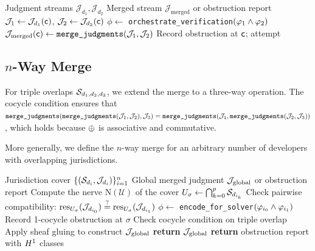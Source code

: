 \documentclass[11pt]{article}
\newcommand{\MergeOp}{\texttt{merge\_judgments}}
\newcommand{\nerve}{\mathrm{N}}
\begin{document}
\begin{algorithm}[t]
\caption{Conflict Resolution via \texttt{orchestrate\_verification}}
\label{alg:conflict}
\begin{algorithmic}[1]
\REQUIRE Judgment streams $\mathcal{J}_{d_1}, \mathcal{J}_{d_2}$
\ENSURE Merged stream $\mathcal{J}_{\text{merged}}$ or obstruction report
  \STATE $\mathcal{J}_1 \gets \mathcal{J}_{d_1}(\mathsf{c})$,
         $\mathcal{J}_2 \gets \mathcal{J}_{d_2}(\mathsf{c})$
  \STATE $\phi \gets$ \texttt{orchestrate\_verification}$(\varphi_1 \wedge \varphi_2)$
    \STATE $\mathcal{J}_{\text{merged}}(\coord) \gets \MergeOp(\J_1, \J_2)$
  \ELSE
    \STATE Record obstruction at $\mathsf{c}$; attempt \REPAIR
  \ENDIF
\ENDFOR
\end{algorithmic}
\end{algorithm}

\subsection{$n$-Way Merge}\label{sec:nway-merge}

For triple overlaps $\mathcal{S}_{d_1,d_2,d_3}$, we extend the merge to a three-way
operation. The cocycle condition ensures that
$\MergeOp(\MergeOp(\J_1, \J_2), \J_3) = \MergeOp(\J_1, \MergeOp(\J_2, \J_3))$,
which holds because $\oplus$ is associative and commutative.

More generally, we define the $n$-way merge for an arbitrary number of
developers with overlapping jurisdictions.

\begin{algorithm}[t]
\caption{$n$-Way Judgment Merge}
\label{alg:nway-merge}
\begin{algorithmic}[1]
\REQUIRE Jurisdiction cover $\{(\mathcal{S}_{d_i}, \mathcal{J}_{d_i})\}_{i=1}^n$
\ENSURE Global merged judgment $\mathcal{J}_{\mathrm{global}}$ or obstruction report
\STATE Compute the nerve $\nerve(\mathcal{U})$ of the cover
\FOR{each $p$-simplex $\sigma = [d_{i_0}, \ldots, d_{i_p}]$ in $\nerve(\mathcal{U})$}
  \STATE $U_\sigma \gets \bigcap_{k=0}^p \mathcal{S}_{d_{i_k}}$
    \STATE Check pairwise compatibility:
           $\mathrm{res}_{U_\sigma}(\mathcal{J}_{d_{i_0}}) \stackrel{?}{=}
            \mathrm{res}_{U_\sigma}(\mathcal{J}_{d_{i_1}})$
      \STATE $\phi \gets$ \texttt{encode\_for\_solver}$(\varphi_{i_0} \wedge \varphi_{i_1})$
        \STATE Record 1-cocycle obstruction at $\sigma$
      \ENDIF
    \ENDIF
  \ENDIF
    \STATE Check cocycle condition on triple overlap
  \ENDIF
\ENDFOR
{}
  \STATE Apply sheaf gluing to construct $\mathcal{J}_{\mathrm{global}}$
  \STATE \textbf{return} $\mathcal{J}_{\mathrm{global}}$
\ELSE
  \STATE \textbf{return} obstruction report with $H^{1}$ classes
\ENDIF
\end{algorithmic}
\end{algorithm}
\end{document}
